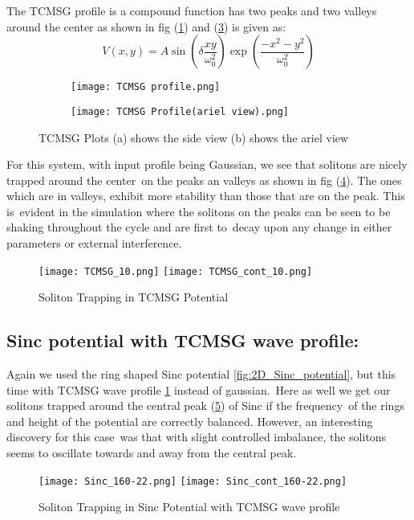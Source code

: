 The TCMSG profile \cite{sunPatternTransformationControl} is a compound function has two peaks and two valleys around the center as shown in fig (\ref{fig:TCMSG_profile1})
and (\ref{fig:TCMSG_profile1_ariel}) is given as:
\begin{equation}
    V(x,y) = A \sin\left(\delta\frac{xy}{\omega_0^2}\right) \exp\left(\frac{-x^2-y^2}{\omega_0^2}\right) \label{TCMSG_eqn}
\end{equation}
\begin{figure}[h!]
    \begin{subfigure}{0.5\textwidth}
        \texttt{[image: TCMSG profile.png]}
        \caption{}
        \label{fig:TCMSG_profile1}
    \end{subfigure}
    \begin{subfigure}{0.5\textwidth}
        \texttt{[image: TCMSG Profile(ariel view).png]}
        \caption{}
        \label{fig:TCMSG_profile1_ariel}
    \end{subfigure}
    \caption{TCMSG Plots (a) shows the side view (b) shows the ariel view}
\end{figure}

For this system, with input profile being Gaussian, we see that solitons are nicely trapped around the center\
on the peaks an valleys as shown in fig (\ref{fig:TCMSG_with_gaussian_profile}). The ones which are in valleys, exhibit more stability than those that are on the peak. This is\
evident in the simulation where the solitons on the peaks can be seen to be shaking throughout the cycle and are first to\
decay upon any change in either parameters or external interference. 
\begin{figure}[h!]
        \texttt{[image: TCMSG\_10.png]}
        \texttt{[image: TCMSG\_cont\_10.png]}
        \caption{Soliton Trapping in TCMSG Potential}
        \label{fig:TCMSG_with_gaussian_profile}
\end{figure}

\newpage
\subsection{Sinc potential with TCMSG wave profile:}
Again we used the ring shaped Sinc potential \ref{fig:2D_Sinc_potential}, but this time with TCMSG wave profile \ref{fig:TCMSG_profile1} instead of gaussian.\
Here as well we get our solitons trapped around the central peak (\ref{fig:Sinc_with_TCMSG_profile}) of Sinc if the frequency\
of the rings and height of the potential are correctly balanced. However, an interesting discovery for this case\
was that with slight controlled imbalance, the solitons seems to oscillate towards and away from the central peak. 
\begin{figure}[H]
    \texttt{[image: Sinc\_160-22.png]}
    \texttt{[image: Sinc\_cont\_160-22.png]}
    \caption{Soliton Trapping in Sinc Potential with TCMSG wave profile} 
        \label{fig:Sinc_with_TCMSG_profile}
\end{figure}



